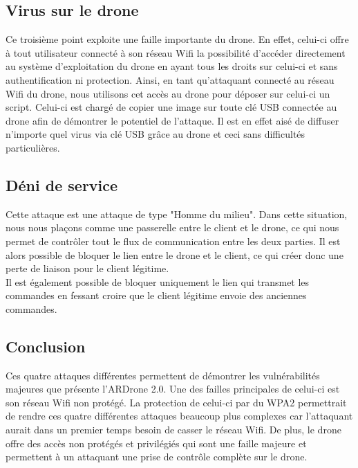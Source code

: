 \subsection{Virus sur le drone}
Ce troisième point exploite une faille importante du drone. En effet, celui-ci offre à tout utilisateur connecté à son réseau Wifi la possibilité d'accéder directement au système
d'exploitation du drone en ayant tous les droits sur celui-ci et sans authentification ni protection. Ainsi, en tant qu'attaquant connecté au réseau Wifi du drone, nous utilisons cet accès au drone pour déposer sur celui-ci un script. Celui-ci est chargé de copier une image sur toute clé USB connectée au drone afin de démontrer le potentiel de l'attaque. Il est en effet aisé de diffuser n'importe quel virus via clé USB grâce au drone et ceci sans difficultés particulières.

\subsection{Déni de service}
Cette attaque est une attaque de type "Homme du milieu". Dans cette situation, nous nous plaçons comme une passerelle entre le client et le drone, ce qui nous permet de contrôler tout le flux de communication entre les deux parties. Il est alors possible de bloquer le lien entre le drone et le client, ce qui créer donc une perte de liaison pour le client légitime.\\
Il est également possible de bloquer uniquement le lien qui transmet les commandes en fessant croire que le client légitime envoie des anciennes commandes.

\subsection{Conclusion}
Ces quatre attaques différentes permettent de démontrer les vulnérabilités majeures que présente l'ARDrone 2.0. Une des failles principales de celui-ci est son réseau Wifi non protégé. La protection de celui-ci par du WPA2 permettrait de rendre ces quatre différentes attaques beaucoup plus complexes car l'attaquant aurait dans un premier temps besoin de casser le réseau Wifi. De plus, le drone offre des accès non protégés et privilégiés qui sont une faille majeure et permettent à un attaquant une prise de contrôle complète sur le drone.
